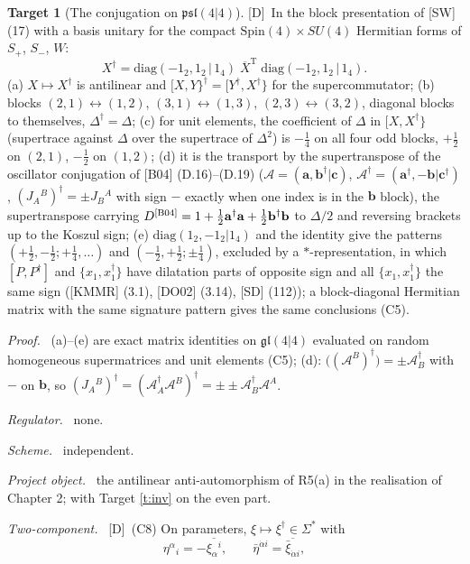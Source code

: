 \documentclass[11pt]{article}
\theoremstyle{definition}
\newtheorem{target}{Target}
\newcommand{\Dl}{\textup{[D]}}
\newcommand{\diagc}{\mathrm{diag}(-1_2,1_2\,|\,1_4)}
\newcommand{\fld}[1]{\par\textit{#1.}\ }
\begin{document}
\begin{target}[The conjugation on $\mathfrak{psl}(4|4)$]\label{t:matrix}
\Dl\ In the block presentation of [SW] (17) with a basis unitary for the compact $\mathrm{Spin}(4)\times SU(4)$ Hermitian forms of $S_+$, $S_-$, $W$:
\[
X^\dagger=\diagc\;\overline{X}^{\mathrm T}\;\diagc .
\]
(a) $X\mapsto X^\dagger$ is antilinear and $[X,Y\}^\dagger=[Y^\dagger,X^\dagger\}$ for the supercommutator; (b) blocks $(2,1)\leftrightarrow(1,2)$, $(3,1)\leftrightarrow(1,3)$, $(2,3)\leftrightarrow(3,2)$, diagonal blocks to themselves, $\Delta^\dagger=\Delta$; (c) for unit elements, the coefficient of $\Delta$ in $[X,X^\dagger\}$ (supertrace against $\Delta$ over the supertrace of $\Delta^2$) is $-\tfrac14$ on all four odd blocks, $+\tfrac12$ on $(2,1)$, $-\tfrac12$ on $(1,2)$; (d) it is the transport by the supertranspose of the oscillator conjugation of [B04] (D.16)--(D.19) ($\mathcal A=(\mathbf a,\mathbf b^\dagger|\mathbf c)$, $\mathcal A^\dagger=(\mathbf a^\dagger,-\mathbf b|\mathbf c^\dagger)$, $(J_A{}^B)^\dagger=\pm J_B{}^A$ with sign $-$ exactly when one index is in the $\mathbf b$ block), the supertranspose carrying $D^{\rm[B04]}=1+\tfrac12\mathbf a^\dagger\mathbf a+\tfrac12\mathbf b^\dagger\mathbf b$ to $\Delta/2$ and reversing brackets up to the Koszul sign; (e) $\mathrm{diag}(1_2,-1_2|1_4)$ and the identity give the patterns $(+\tfrac12,-\tfrac12;+\tfrac14,\dots)$ and $(-\tfrac12,+\tfrac12;\pm\tfrac14)$, excluded by a $*$-representation, in which $[P,P^\dagger]$ and $\{x_1,x_1^\dagger\}$ have dilatation parts of opposite sign and all $\{x_1,x_1^\dagger\}$ the same sign ([KMMR] (3.1), [DO02] (3.14), [SD] (112)); a block-diagonal Hermitian matrix with the same signature pattern gives the same conclusions (C5).
\fld{Proof} (a)--(e) are exact matrix identities on $\mathfrak{gl}(4|4)$ evaluated on random homogeneous supermatrices and unit elements (C5); (d): $\big((\mathcal A^B)^\dagger\big)=\pm\mathcal A^\dagger_B$ with $-$ on $\mathbf b$, so $(J_A{}^B)^\dagger=(\mathcal A^\dagger_A\mathcal A^B)^\dagger=\pm\pm\mathcal A^\dagger_B\mathcal A^A$.
\fld{Regulator} none. \fld{Scheme} independent.
\fld{Project object} the antilinear anti-automorphism of R5(a) in the realisation of Chapter 2; with Target \ref{t:inv} on the even part.
\fld{Two-component} \Dl\ (C8) On parameters, $\xi\mapsto\xi^\dagger\in\Sigma^*$ with
\[
\eta^\alpha{}_i=-\overline{\xi_\alpha{}^i},\qquad\bar\eta^{\dot\alpha i}=\overline{\bar\xi_{\dot\alpha i}},
\]

\end{target}
\end{document}
